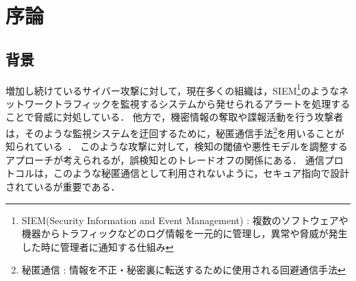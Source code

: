 \section{序論}
\subsection{背景}
増加し続けているサイバー攻撃に対して，現在多くの組織は，SIEM\footnote{SIEM(Security Information and Event Management) : 複数のソフトウェアや機器からトラフィックなどのログ情報を一元的に管理し，異常や脅威が発生した時に管理者に通知する仕組み}のようなネットワークトラフィックを監視するシステムから発せられるアラートを処理することで脅威に対処している．
他方で，機密情報の奪取や諜報活動を行う攻撃者は，そのような監視システムを迂回するために，秘匿通信手法\footnote{秘匿通信 : 情報を不正・秘密裏に転送するために使用される回避通信手法}を用いることが知られている~\cite{mitre-custom-c2}．
このような攻撃に対して，検知の閾値や悪性モデルを調整するアプローチが考えられるが，誤検知とのトレードオフの関係にある．
通信プロトコルは，このような秘匿通信として利用されないように，セキュア指向で設計されているが重要である．

